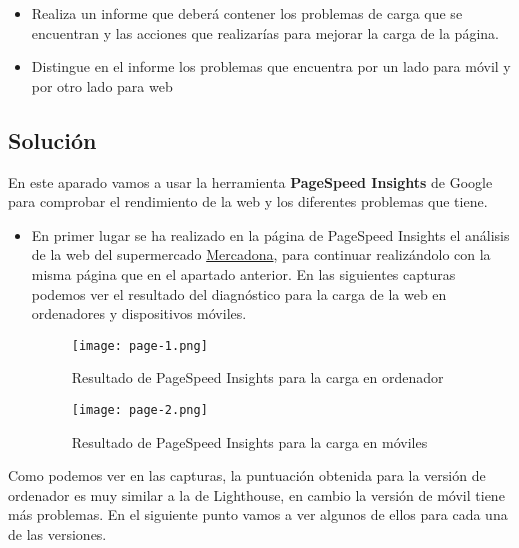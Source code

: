 \begin{itemize}
    \item Realiza un  informe  que deberá contener los problemas de carga que se encuentran y las acciones que realizarías para mejorar la carga de la página.
    \item Distingue en el informe los problemas que encuentra por un lado para móvil y por otro lado para web
\end{itemize}

\subsection{Solución}

En este aparado vamos a usar la herramienta \textbf{PageSpeed Insights} de Google para comprobar el rendimiento de la web y los diferentes problemas que tiene.

\begin{itemize}
    \item En primer lugar se ha realizado en la página de PageSpeed Insights el análisis de la web del supermercado  \href{https://www.mercadona.es/}{Mercadona}, para continuar realizándolo con la misma página que en el apartado anterior. En las siguientes capturas podemos ver el resultado del diagnóstico para la carga de la web en ordenadores y dispositivos móviles.

    \begin{figure}[H]
        \centering
        \texttt{[image: page-1.png]}
        \caption{Resultado de PageSpeed Insights para la carga en ordenador}
    \end{figure}

        \begin{figure}[H]
        \centering
        \texttt{[image: page-2.png]}
        \caption{Resultado de PageSpeed Insights para la carga en móviles}
    \end{figure}
\end{itemize}

Como podemos ver en las capturas, la puntuación obtenida para la versión de ordenador es muy similar a la de Lighthouse, en cambio la versión de móvil tiene más problemas. En el siguiente punto vamos a ver algunos de ellos para cada una de las versiones.

